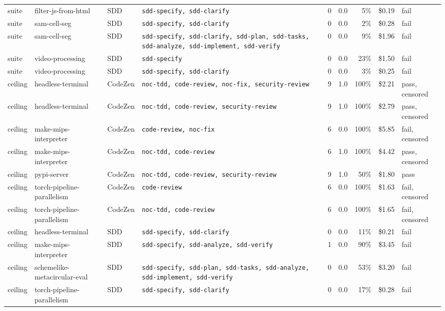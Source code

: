 \begin{tabular}{@{}llllrrrrl@{}}
suite & filter-js-from-html & SDD & \texttt{\footnotesize sdd-specify, sdd-clarify} & 0 & 0.0 & 5\% & \$0.19 & fail \\
suite & sam-cell-seg & SDD & \texttt{\footnotesize sdd-specify, sdd-clarify} & 0 & 0.0 & 2\% & \$0.28 & fail \\
suite & sam-cell-seg & SDD & \texttt{\footnotesize sdd-specify, sdd-clarify, sdd-plan, sdd-tasks, sdd-analyze, sdd-implement, sdd-verify} & 0 & 0.0 & 9\% & \$1.96 & fail \\
suite & video-processing & SDD & \texttt{\footnotesize sdd-specify} & 0 & 0.0 & 23\% & \$1.50 & fail \\
suite & video-processing & SDD & \texttt{\footnotesize sdd-specify, sdd-clarify} & 0 & 0.0 & 3\% & \$0.25 & fail \\
ceiling & headless-terminal & CodeZen & \texttt{\footnotesize noc-tdd, code-review, noc-fix, security-review} & 9 & 1.0 & 100\% & \$2.21 & pass, censored \\
ceiling & headless-terminal & CodeZen & \texttt{\footnotesize noc-tdd, code-review, security-review} & 9 & 1.0 & 100\% & \$2.79 & pass, censored \\
ceiling & make-mips-interpreter & CodeZen & \texttt{\footnotesize code-review, noc-fix} & 6 & 0.0 & 100\% & \$5.85 & fail, censored \\
ceiling & make-mips-interpreter & CodeZen & \texttt{\footnotesize noc-tdd, code-review} & 6 & 1.0 & 100\% & \$4.42 & pass, censored \\
ceiling & pypi-server & CodeZen & \texttt{\footnotesize noc-tdd, code-review, security-review} & 9 & 1.0 & 50\% & \$1.80 & pass \\
ceiling & torch-pipeline-parallelism & CodeZen & \texttt{\footnotesize code-review} & 6 & 0.0 & 100\% & \$1.63 & fail, censored \\
ceiling & torch-pipeline-parallelism & CodeZen & \texttt{\footnotesize noc-tdd, code-review} & 6 & 0.0 & 100\% & \$1.65 & fail, censored \\
ceiling & headless-terminal & SDD & \texttt{\footnotesize sdd-specify, sdd-clarify} & 0 & 0.0 & 11\% & \$0.21 & fail \\
ceiling & make-mips-interpreter & SDD & \texttt{\footnotesize sdd-specify, sdd-analyze, sdd-verify} & 1 & 0.0 & 90\% & \$3.45 & fail \\
ceiling & schemelike-metacircular-eval & SDD & \texttt{\footnotesize sdd-specify, sdd-plan, sdd-tasks, sdd-analyze, sdd-implement, sdd-verify} & 0 & 0.0 & 53\% & \$3.20 & fail \\
ceiling & torch-pipeline-parallelism & SDD & \texttt{\footnotesize sdd-specify, sdd-clarify} & 0 & 0.0 & 17\% & \$0.28 & fail \\
\bottomrule
\end{tabular}
